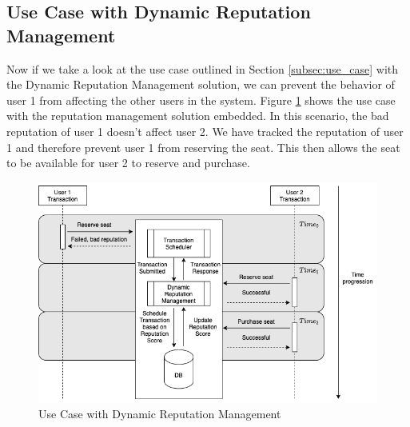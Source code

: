 \subsection{Use Case with Dynamic Reputation Management}
\label{sec:use_case_with_drm}

Now if we take a look at the use case outlined in Section \ref{subsec:use_case} with the Dynamic Reputation Management solution, we can prevent the behavior of user 1 from affecting the other users in the system. Figure \ref{image:airline_reservation_with_drm} shows the use case with the reputation management solution embedded. In this scenario, the bad reputation of user 1 doesn't affect user 2. We have tracked the reputation of user 1 and therefore prevent user 1 from reserving the seat. This then allows the seat to be available for user 2 to reserve and purchase.

\begin{figure}
\centering
\includegraphics[scale=0.50]{images/AirlineReservation_w_DRM.png}
\caption{Use Case with Dynamic Reputation Management}
\label{image:airline_reservation_with_drm}
\end{figure}